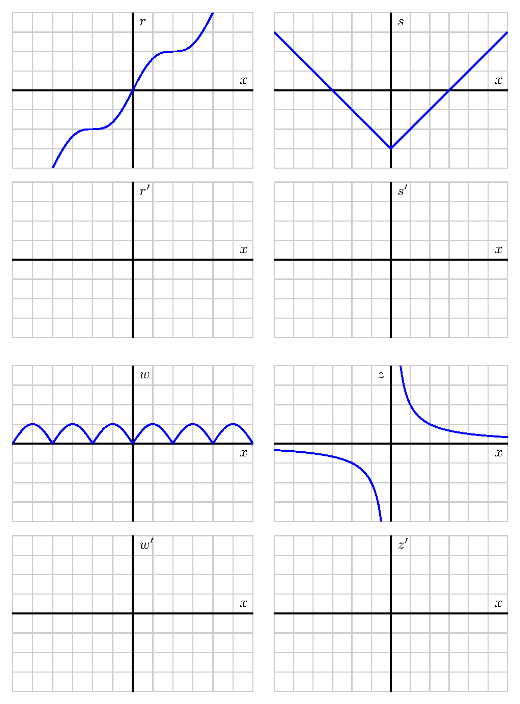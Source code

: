 \begin{center}
\includegraphics{figures/1_4_Act1c.eps}
\centerline{\hspace{4in}}
\includegraphics{figures/1_4_Act1d.eps}
\end{center}


